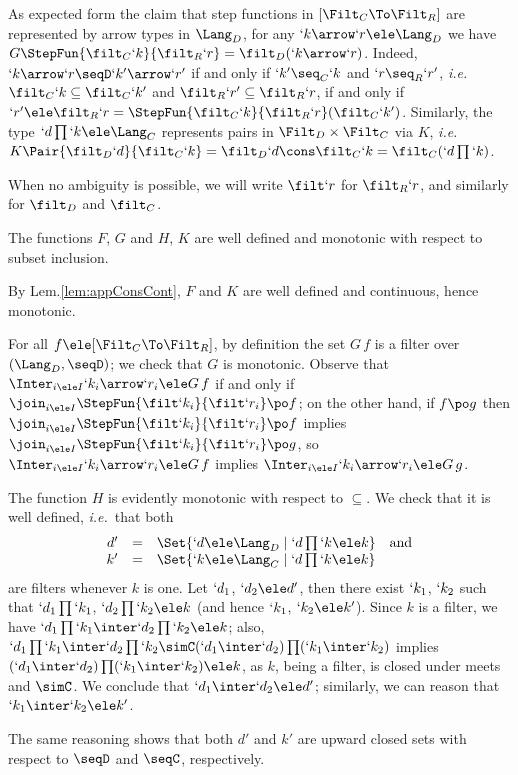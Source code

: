 \documentclass{lmcs}
\def\ie{\emph{i.e.}}
\begin{document}
 \begin{rem} \label{rem:GK}
As expected form the claim that step functions in $[ \Filt_C\To\Filt_R]$ are represented by arrow types in $\Lang_D$, for any $`k\arrow `r \ele \Lang_D$ we have $G\StepFun{\filt_C`k}{\filt_R`r} = \filt_D(`k\arrow `r )$. 
Indeed, $`k\arrow `r \seqD `k'\arrow `r'$ if and only if $`k'\seq_C`k$ and $`r\seq_R`r'$, \ie~$\filt_C`k\subseteq\filt_C`k'$ and $\filt_R`r'\subseteq\filt_R`r$, %
if and only if $`r' \ele \filt_R`r = \StepFun{\filt_C`k}{\filt_R`r}(\filt_C`k')$.
%
Similarly, the type $`d\prod`k\ele \Lang_C$ represents pairs in $\Filt_D \times \Filt_C$ via $K$, \ie~$K\Pair{\filt_D`d}{\filt_C`k} = \filt_D`d \cons \filt_C`k = \filt_C(`d\prod`k)$.
 \end{rem}

When no ambiguity is possible, we will write $\filt `r$ for $\filt_R `r$, and similarly for $\filt_D$ and $\filt_C$.

 \begin{lem} \label{lem:filterMappingWellDef}
The functions $F$, $G$ and $H$, $K$ are well defined and monotonic with respect to subset inclusion.
 \end{lem}

 \begin{Proof} By Lem.\skp\ref{lem:appConsCont}, $F$ and $K$ are well defined and continuous, hence monotonic. 

For all $f \ele [ \Filt_C\To\Filt_R]$, by definition the set $G\,f$ is a filter over $(\Lang_D, \seqD)$; we check that $G$ is monotonic.
Observe that $\Inter_{i \ele I} `k_i\arrow `r_i \ele G\,f$ if and only if $\join_{i \ele I} \StepFun{\filt `k_i }{ \filt `r_i} \po f$; on the other hand,
if $f \po g$ then $\join_{i \ele I} \StepFun{\filt `k_i }{ \filt `r_i} \po f$ implies $\join_{i \ele I} \StepFun{\filt `k_i }{ \filt `r_i} \po g$, so $\Inter_{i \ele I} `k_i\arrow `r_i \ele G\,f$ implies $\Inter_{i \ele I} `k_i\arrow `r_i \ele G\,g$.

The function $H$ is evidently monotonic with respect to $\subseteq$.
We check that it is well defined, \ie~that both 
%
 \[ \begin{array}{rcll}
d' &=& \Set{`d \ele \Lang_D \mid `d\prod `k \ele k } & \textrm{and} \\
k' &=& \Set{`k \ele \Lang_C \mid `d\prod `k \ele k }
 \end{array} \] 
are filters whenever $k$ is one. 
Let $`d_1$, $`d_2 \ele d'$, then there exist $`k_1$, $`k_2$ such that $`d_1\prod `k_1$, $`d_2\prod `k_2 \ele k$ (and hence $`k_1$, $`k_2 \ele k'$).
Since $k$ is a filter, we have $`d_1\prod `k_1\inter `d_2\prod `k_2 \ele k$; also, $`d_1\prod `k_1\inter `d_2\prod `k_2 \simC (`d_1\inter`d_2)\prod (`k_1\inter`k_2)$ implies $(`d_1\inter`d_2)\prod (`k_1\inter`k_2) \ele k$, as $k$, being a filter, is closed under meets and $\simC$. 
We conclude that $`d_1\inter`d_2 \ele d'$; similarly, we can reason that $`k_1\inter`k_2 \ele k'$. 

The same reasoning shows that both $d'$ and $k'$ are upward closed sets with respect to $\seqD$ and $\seqC$, respectively.
 \end{Proof}
\end{document}
